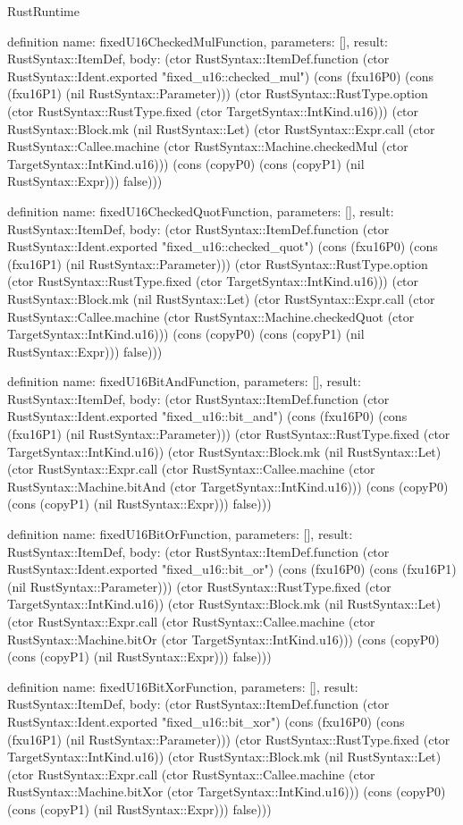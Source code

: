 \begin{lexlean}{RustRuntime}
\begin{semanticmodule}
definition{
  name: fixedU16CheckedMulFunction,
  parameters: [],
  result: RustSyntax::ItemDef,
  body: (ctor RustSyntax::ItemDef.function (ctor RustSyntax::Ident.exported "fixed_u16::checked_mul") (cons (fxu16P0) (cons (fxu16P1) (nil RustSyntax::Parameter))) (ctor RustSyntax::RustType.option (ctor RustSyntax::RustType.fixed (ctor TargetSyntax::IntKind.u16))) (ctor RustSyntax::Block.mk (nil RustSyntax::Let) (ctor RustSyntax::Expr.call (ctor RustSyntax::Callee.machine (ctor RustSyntax::Machine.checkedMul (ctor TargetSyntax::IntKind.u16))) (cons (copyP0) (cons (copyP1) (nil RustSyntax::Expr))) false)))
}

definition{
  name: fixedU16CheckedQuotFunction,
  parameters: [],
  result: RustSyntax::ItemDef,
  body: (ctor RustSyntax::ItemDef.function (ctor RustSyntax::Ident.exported "fixed_u16::checked_quot") (cons (fxu16P0) (cons (fxu16P1) (nil RustSyntax::Parameter))) (ctor RustSyntax::RustType.option (ctor RustSyntax::RustType.fixed (ctor TargetSyntax::IntKind.u16))) (ctor RustSyntax::Block.mk (nil RustSyntax::Let) (ctor RustSyntax::Expr.call (ctor RustSyntax::Callee.machine (ctor RustSyntax::Machine.checkedQuot (ctor TargetSyntax::IntKind.u16))) (cons (copyP0) (cons (copyP1) (nil RustSyntax::Expr))) false)))
}

definition{
  name: fixedU16BitAndFunction,
  parameters: [],
  result: RustSyntax::ItemDef,
  body: (ctor RustSyntax::ItemDef.function (ctor RustSyntax::Ident.exported "fixed_u16::bit_and") (cons (fxu16P0) (cons (fxu16P1) (nil RustSyntax::Parameter))) (ctor RustSyntax::RustType.fixed (ctor TargetSyntax::IntKind.u16)) (ctor RustSyntax::Block.mk (nil RustSyntax::Let) (ctor RustSyntax::Expr.call (ctor RustSyntax::Callee.machine (ctor RustSyntax::Machine.bitAnd (ctor TargetSyntax::IntKind.u16))) (cons (copyP0) (cons (copyP1) (nil RustSyntax::Expr))) false)))
}

definition{
  name: fixedU16BitOrFunction,
  parameters: [],
  result: RustSyntax::ItemDef,
  body: (ctor RustSyntax::ItemDef.function (ctor RustSyntax::Ident.exported "fixed_u16::bit_or") (cons (fxu16P0) (cons (fxu16P1) (nil RustSyntax::Parameter))) (ctor RustSyntax::RustType.fixed (ctor TargetSyntax::IntKind.u16)) (ctor RustSyntax::Block.mk (nil RustSyntax::Let) (ctor RustSyntax::Expr.call (ctor RustSyntax::Callee.machine (ctor RustSyntax::Machine.bitOr (ctor TargetSyntax::IntKind.u16))) (cons (copyP0) (cons (copyP1) (nil RustSyntax::Expr))) false)))
}

definition{
  name: fixedU16BitXorFunction,
  parameters: [],
  result: RustSyntax::ItemDef,
  body: (ctor RustSyntax::ItemDef.function (ctor RustSyntax::Ident.exported "fixed_u16::bit_xor") (cons (fxu16P0) (cons (fxu16P1) (nil RustSyntax::Parameter))) (ctor RustSyntax::RustType.fixed (ctor TargetSyntax::IntKind.u16)) (ctor RustSyntax::Block.mk (nil RustSyntax::Let) (ctor RustSyntax::Expr.call (ctor RustSyntax::Callee.machine (ctor RustSyntax::Machine.bitXor (ctor TargetSyntax::IntKind.u16))) (cons (copyP0) (cons (copyP1) (nil RustSyntax::Expr))) false)))
}


\end{semanticmodule}
\end{lexlean}
